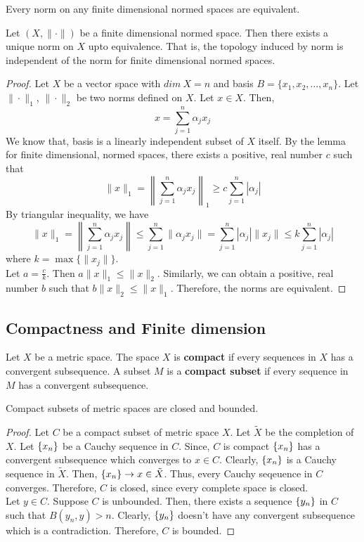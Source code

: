 \begin{theorem}
	Every norm on any finite dimensional normed spaces are equivalent.
\end{theorem}
\begin{commentary}
	Let $(X,\|\cdot\|)$ be a finite dimensional normed space.
	Then there exists a unique norm on $X$ upto equivalence.
	That is, the topology induced by norm is independent of the norm for finite dimensional normed spaces.	
\end{commentary}
\begin{proof}
	Let $X$ be a vector space with $dim\ X = n$ and basis $B = \{ x_1, x_2, \dots ,x_n \}$.
	Let $\|\cdot\|_1$, $\|\cdot\|_2$ be two norms defined on $X$.
	Let $x \in X$.
	Then,
	\[ x = \sum_{j=1}^n \alpha_j x_j \]
	We know that, basis is a linearly independent subset of $X$ itself.
	By the lemma for finite dimensional, normed spaces, there exists a positive, real number $c$ such that 
	\[ \| x \|_1 = \left\| \sum_{j=1}^n \alpha_j x_j \right\|_1 \ge c \sum_{j=1}^n |\alpha_j | \]
	By triangular inequality, we have
	\[ \| x \|_1 = \left\| \sum_{j=1}^n \alpha_j x_j \right\| \le \sum_{j=1}^n \| \alpha_j x_j \| = \sum_{j=1}^n |\alpha_j| \|x_j\| \le k \sum_{j=1}^n |\alpha_j| \]
	where $k = \max\{\|x_j\|\}$.\\

	Let $a = \frac{c}{k}$.
	Then $a\| x \|_1 \le \|x\|_2$.
	Similarly, we can obtain a positive, real number $b$ such that $b\| x \|_2 \le \| x \|_1$.
	Therefore, the norms are equivalent.
\end{proof}

\subsection{Compactness and Finite dimension}
\begin{definition}[compact]
	Let $X$ be a metric space.
	The space $X$ is \textbf{compact} if every sequences in $X$ has a convergent subsequence.
	A subset $M$ is a \textbf{compact subset} if every sequence in $M$ has a convergent subsequence.
\end{definition}
\begin{lemma}[compact]
	Compact subsets of metric spaces are closed and bounded.
\end{lemma}
\begin{proof}
	Let $C$ be a compact subset of metric space $X$.
	Let $\tilde{X}$ be the completion of $X$.
	Let $\left\{x_n\right\}$ be a Cauchy sequence in $C$.
	Since, $C$ is compact $\left\{x_n\right\}$ has a convergent subsequence which converges to $x \in C$.
	Clearly, $\left\{x_n\right\}$ is a Cauchy sequence in $\tilde{X}$.
	Then, $\left\{x_n\right\} \to x \in \tilde{X}$.
	Thus, every Cauchy seqeuence in $C$ converges.
	Therefore, $C$ is closed, since every complete space is closed.\\

	Let $y \in C$.
	Suppose $C$ is unbounded.
	Then, there exists a sequence $\left\{y_n\right\}$ in $C$ such that $B(y_n,y) > n$.
	Clearly, $\left\{y_n\right\}$ doesn't have any convergent subsequence which is a contradiction.
	Therefore, $C$ is bounded.
\end{proof}

